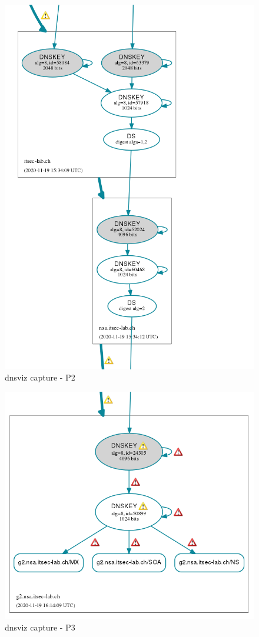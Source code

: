 \begin{figure}[H]
	\centering
	\includegraphics[width=0.7\linewidth]{images/dnspath2.png}
	\caption{dnsviz capture - P2}
	\label{fig:dnsviz capture_P2}
\end{figure}
\begin{figure}[H]
	\centering
	\includegraphics[width=0.7\linewidth]{images/dnspath3.png}
	\caption{dnsviz capture - P3}
	\label{fig:dnsviz capture_P3}
\end{figure}
